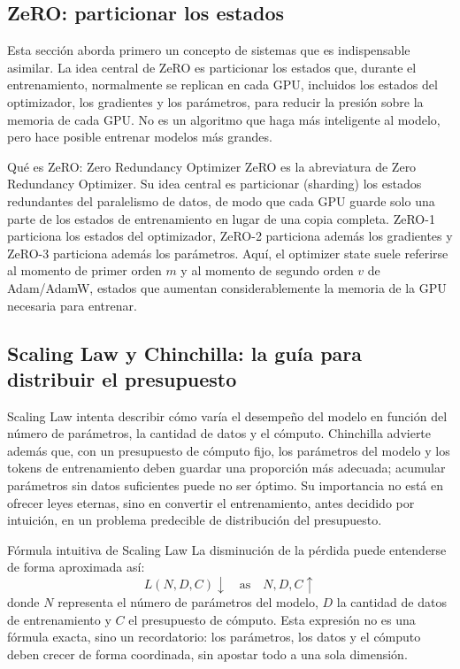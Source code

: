 \documentclass[a4paper]{article}
\begin{document}
\subsection{ZeRO: particionar los estados}

Esta sección aborda primero un concepto de sistemas que es indispensable asimilar. La idea central de ZeRO es particionar los estados que, durante el entrenamiento, normalmente se replican en cada GPU, incluidos los estados del optimizador, los gradientes y los parámetros, para reducir la presión sobre la memoria de cada GPU. No es un algoritmo que haga más inteligente al modelo, pero hace posible entrenar modelos más grandes.

\begin{importantbox}{Qué es ZeRO: Zero Redundancy Optimizer}
ZeRO es la abreviatura de Zero Redundancy Optimizer. Su idea central es particionar (sharding) los estados redundantes del paralelismo de datos, de modo que cada GPU guarde solo una parte de los estados de entrenamiento en lugar de una copia completa. ZeRO-1 particiona los estados del optimizador, ZeRO-2 particiona además los gradientes y ZeRO-3 particiona además los parámetros. Aquí, el optimizer state suele referirse al momento de primer orden \(m\) y al momento de segundo orden \(v\) de Adam/AdamW, estados que aumentan considerablemente la memoria de la GPU necesaria para entrenar.
\end{importantbox}

\subsection{Scaling Law y Chinchilla: la guía para distribuir el presupuesto}

Scaling Law intenta describir cómo varía el desempeño del modelo en función del número de parámetros, la cantidad de datos y el cómputo. Chinchilla advierte además que, con un presupuesto de cómputo fijo, los parámetros del modelo y los tokens de entrenamiento deben guardar una proporción más adecuada; acumular parámetros sin datos suficientes puede no ser óptimo. Su importancia no está en ofrecer leyes eternas, sino en convertir el entrenamiento, antes decidido por intuición, en un problema predecible de distribución del presupuesto.

\begin{knowledgebox}{Fórmula intuitiva de Scaling Law}
La disminución de la pérdida puede entenderse de forma aproximada así:
\[
L(N, D, C) \downarrow \quad \text{as} \quad N,D,C \uparrow
\]
donde \(N\) representa el número de parámetros del modelo, \(D\) la cantidad de datos de entrenamiento y \(C\) el presupuesto de cómputo. Esta expresión no es una fórmula exacta, sino un recordatorio: los parámetros, los datos y el cómputo deben crecer de forma coordinada, sin apostar todo a una sola dimensión.
\end{knowledgebox}
\end{document}
